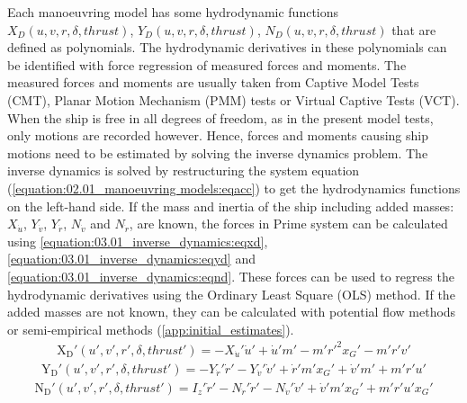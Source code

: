 Each manoeuvring model has some hydrodynamic functions \(X_D(u,v,r,\delta,thrust)\), \(Y_D(u,v,r,\delta,thrust)\), \(N_D(u,v,r,\delta,thrust)\) that are defined as polynomials. The hydrodynamic derivatives in these polynomials can be identified with force regression of measured forces and moments. The measured forces and moments are usually taken from Captive Model Tests (CMT), Planar Motion Mechanism (PMM) tests or Virtual Captive Tests (VCT). When the ship is free in all degrees of freedom, as in the present model tests, only
motions are recorded however. Hence, forces and moments causing ship motions need to be estimated by
solving the inverse dynamics problem.
The inverse dynamics is solved by restructuring the system equation (\autoref{equation:02.01_manoeuvring models:eqacc}) to get the hydrodynamics functions on the left-hand side. If the mass and inertia of the ship including added masses: \(X_{\dot{u}}\), \(Y_{\dot{v}}\), \(Y_{\dot{r}}\), \(N_{\dot{v}}\) and \(N_{\dot{r}}\), are known, the forces in Prime system can be calculated using \autoref{equation:03.01_inverse_dynamics:eqxd}, \autoref{equation:03.01_inverse_dynamics:eqyd} and \autoref{equation:03.01_inverse_dynamics:eqnd}.
These forces can be used to regress the hydrodynamic derivatives using the Ordinary Least Square (OLS) method. If the added masses are not known, they can be calculated with potential flow methods or semi-empirical methods (\autoref{app:initial_estimates}). 
\begin{equation}\label{equation:03.01_inverse_dynamics:eqxd}
\begin{split}\displaystyle \operatorname{X_{D}'}{\left(u',v',r',\delta,thrust' \right)} = - X_{\dot{u}}' \dot{u}' + \dot{u}' m' - m' r'^{2} x_{G}' - m' r' v'\end{split}
\end{equation}\begin{equation}\label{equation:03.01_inverse_dynamics:eqyd}
\begin{split}\displaystyle \operatorname{Y_{D}'}{\left(u',v',r',\delta,thrust' \right)} = - Y_{\dot{r}}' \dot{r}' - Y_{\dot{v}}' \dot{v}' + \dot{r}' m' x_{G}' + \dot{v}' m' + m' r' u'\end{split}
\end{equation}\begin{equation}\label{equation:03.01_inverse_dynamics:eqnd}
\begin{split}\displaystyle \operatorname{N_{D}'}{\left(u',v',r',\delta,thrust' \right)} = I_{z}' \dot{r}' - N_{\dot{r}}' \dot{r}' - N_{\dot{v}}' \dot{v}' + \dot{v}' m' x_{G}' + m' r' u' x_{G}'\end{split}
\end{equation}

